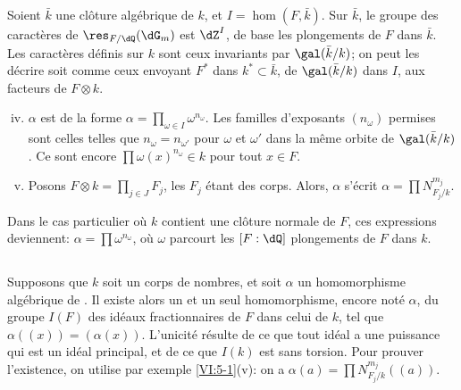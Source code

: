 Soient $\bar k$ une clôture algébrique de $k$, et $I=\hom(F,\bar k)$. Sur 
$\bar k$, le groupe des caractères de $\res_{F/\dQ}(\dG_m)$ est $\dZ^I$, de 
base les plongements de $F$ dans $\bar k$. Les caractères définis sur $k$ 
sont ceux invariants par $\gal(\bar k/k)$; on peut les décrire soit comme 
ceux envoyant $F^\ast$ dans $k^\ast\subset \bar k$,  de $\gal(\bar k/k)$ dans $I$,  aux facteurs de 
$F\otimes k$. 
\begin{enumerate}[(i)]
\setcounter{enumi}{3}
  \item $\alpha$ est de la forme 
    $\alpha=\prod_{\omega\in I} \omega^{n_\omega}$. Les familles d'exposants 
    $(n_\omega)$ permises sont celles telles que $n_\omega=n_{\omega'}$ pour 
    $\omega$ et $\omega'$ dans la même orbite de $\gal(\bar k/k)$. Ce sont 
    encore  $\prod \omega(x)^{n_\omega}\in k$ pour tout 
    $x\in F$. 
  
\item {}Posons $F\otimes k=\prod_{j\in J} F_j$, les $F_j$ étant des corps. 
    Alors, $\alpha$ s'écrit $\alpha=\prod N_{F_j/k}^{m_j}$. 
\end{enumerate}

Dans le cas particulier où $k$ contient une clôture normale de $F$, ces 
expressions deviennent: $\alpha=\prod \omega^{n_\omega}$, où $\omega$ 
parcourt les $[F:\dQ]$ plongements de $F$ dans $k$. 





\subsection{}\label{VI:5-2}

Supposons que $k$ soit un corps de nombres, et soit $\alpha$ un homomorphisme 
algébrique de . Il existe alors un et un seul 
homomorphisme, encore noté $\alpha$, du groupe $I(F)$ des idéaux 
fractionnaires de $F$ dans celui de $k$, tel que $\alpha((x))=(\alpha(x))$. 
L'unicité résulte de ce que tout idéal a une puissance qui est un 
idéal principal, et de ce que $I(k)$ est sans torsion. Pour prouver 
l'existence, on utilise par exemple \ref{VI:5-1}(v): on a 
$\alpha(a) = \prod N_{F_j/k}^{m_j}((a))$. 





